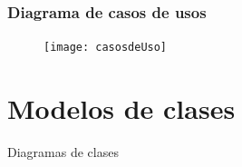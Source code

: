 \documentclass[12pt,a4paper,titlepage,oneside]{article}
\begin{document}
\subsubsection{Diagrama de casos de usos}
 
\begin{figure}[htb]
\centerline{\texttt{[image: casosdeUso]}}
\label{fig:celda}
\end{figure}
 
 
 
\section{Modelos de clases}

Diagramas de clases  
 
 
\end{document}
